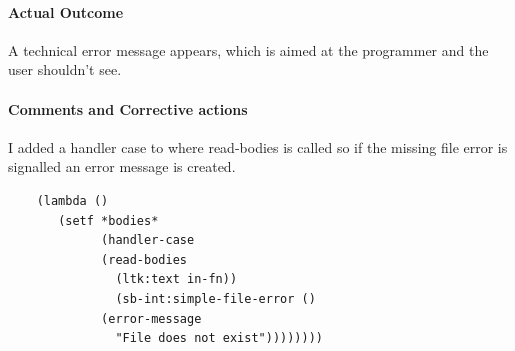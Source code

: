 \paragraph{Actual Outcome}
A technical error message appears, which is aimed at the programmer and the user
shouldn't see.
\paragraph{Comments and Corrective actions}
I added a handler case to where read-bodies is called so if the missing file
error is signalled an error message is created.
\begin{lstlisting}
	(lambda () 
	   (setf *bodies* 
	         (handler-case 
		     (read-bodies 
		       (ltk:text in-fn))
	           (sb-int:simple-file-error ()
		     (error-message
		       "File does not exist"))))))))
\end{lstlisting}


